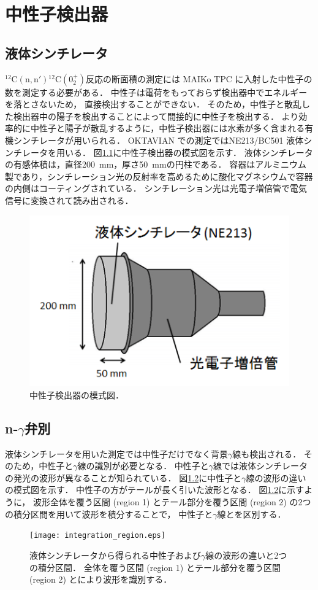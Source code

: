 \documentclass[../master]{subfiles}
\begin{document}
\chapter{中性子検出器}
\section{液体シンチレータ}
${}^{12}\mathrm{C}(\mathrm{n},\mathrm{n}'){}^{12}\mathrm{C} (0_2^+)$反応の断面積の測定には
MAIKo TPC に入射した中性子の数を測定する必要がある．
中性子は電荷をもっておらず検出器中でエネルギーを落とさないため，
直接検出することができない．
そのため，中性子と散乱した検出器中の陽子を検出することによって間接的に中性子を検出する．
より効率的に中性子と陽子が散乱するように，中性子検出器には水素が多く含まれる有機シンチレータが用いられる．
OKTAVIAN での測定ではNE213/BC501 液体シンチレータを用いる．
図\ref{fig::neutron_detector}に中性子検出器の模式図を示す．
液体シンチレータの有感体積は，直径\SI{200}{\milli\metre}，厚さ\SI{50}{\milli\metre}の円柱である．
容器はアルミニウム製であり，シンチレーション光の反射率を高めるために酸化マグネシウムで容器の内側はコーティングされている．
シンチレーション光は光電子増倍管で電気信号に変換されて読み出される．
\begin{figure}
  \centering
  \includegraphics[clip, width=0.6\columnwidth]{pic/neutron_detector.png}
  \caption{中性子検出器の模式図．}
  \label{fig::neutron_detector}
\end{figure}

\section{n-$\gamma$弁別}
液体シンチレータを用いた測定では中性子だけでなく背景$\gamma$線も検出される．
そのため，中性子と$\gamma$線の識別が必要となる．
中性子と$\gamma$線では液体シンチレータの発光の波形が異なることが知られている．
図\ref{fig::pulse_shape_n_gamma}に中性子と$\gamma$線の波形の違いの模式図を示す．
中性子の方がテールが長く引いた波形となる．
図\ref{fig::pulse_shape_n_gamma}に示すように，
波形全体を覆う区間 (region 1) とテール部分を覆う区間 (region 2) の2つの積分区間を用いて波形を積分することで，
中性子と$\gamma$線とを区別する．
\begin{figure}
  \centering
  \texttt{[image: integration\_region.eps]}
  \caption[液体シンチレータから得られる中性子および$\gamma$線の波形の違いと2つの積分区間．]
          {液体シンチレータから得られる中性子および$\gamma$線の波形の違いと2つの積分区間．
            全体を覆う区間 (region 1) とテール部分を覆う区間 (region 2) とにより波形を識別する．
          }
  \label{fig::pulse_shape_n_gamma} 
\end{figure}
\end{document}
